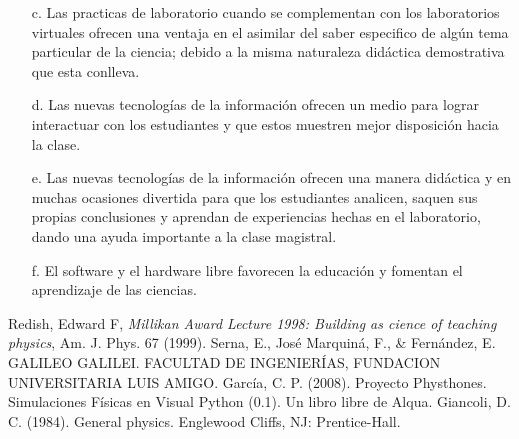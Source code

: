 \documentclass[12pt]{article}
\begin{document}
\begin{multicols}{2}
\begin{enumerate}
\item[c. ] Las practicas de laboratorio cuando se complementan con los laboratorios virtuales ofrecen una ventaja en el asimilar del saber especifico de algún tema particular de la ciencia; debido a la misma naturaleza didáctica demostrativa que esta conlleva.

\item[d. ] Las nuevas tecnologías de la información ofrecen un medio para lograr interactuar con los estudiantes y que estos muestren mejor disposición hacia la clase. 

\item[e. ] Las nuevas tecnologías de la información ofrecen una manera didáctica y en muchas ocasiones divertida para que los estudiantes analicen, saquen sus propias conclusiones y aprendan de experiencias hechas en el laboratorio, dando una ayuda importante a la clase magistral.

\item[f. ] El software y el hardware libre favorecen la educación y fomentan el aprendizaje de las ciencias.

\end{enumerate}
\end{multicols}
\begin{thebibliography}{99}
 Redish, Edward F, \emph{Millikan Award Lecture 1998: Building as cience of teaching physics}, Am. J. Phys. 67 (1999).
 Serna, E., José Marquiná, F., \& Fernández, E. GALILEO GALILEI. FACULTAD DE INGENIERÍAS, FUNDACION UNIVERSITARIA LUIS AMIGO.
 García, C. P. (2008). Proyecto Physthones. Simulaciones Físicas en Visual Python (0.1). Un libro libre de Alqua.
 Giancoli, D. C. (1984). General physics. Englewood Cliffs, NJ: Prentice-Hall.

\end{thebibliography}
\end{document}
